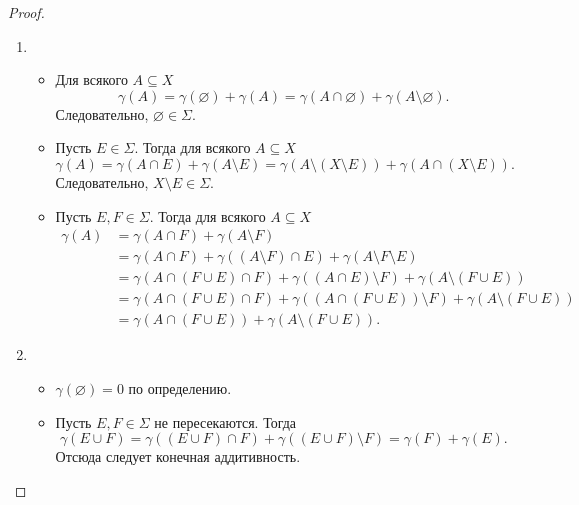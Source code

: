 \documentclass[12pt,a4paper]{article}
\begin{document}
    \begin{proof}
        \begin{enumerate}
            \item
                \begin{itemize}
                    \item Для всякого $A \subseteq X$
                        \[\gamma(A) = \gamma(\varnothing) + \gamma(A) = \gamma(A \cap \varnothing) + \gamma(A \setminus \varnothing).\]
                        Следовательно, $\varnothing \in \Sigma$.
                    \item Пусть $E \in \Sigma$. Тогда для всякого $A \subseteq X$
                        \[\gamma(A) = \gamma(A \cap E) + \gamma(A \setminus E) = \gamma(A \setminus (X \setminus E)) + \gamma(A \cap (X \setminus E)).\]
                        Следовательно, $X \setminus E \in \Sigma$.
                    \item Пусть $E, F \in \Sigma$. Тогда для всякого $A \subseteq X$
                        \begin{align*}
                            \gamma(A)
                            &= \gamma(A \cap F) + \gamma(A \setminus F)\\
                            &= \gamma(A \cap F) + \gamma((A \setminus F) \cap E) + \gamma(A \setminus F \setminus E)\\
                            &= \gamma(A \cap (F \cup E) \cap F) + \gamma((A \cap E) \setminus F) + \gamma(A \setminus (F \cup E))\\
                            &= \gamma(A \cap (F \cup E) \cap F) + \gamma((A \cap (F \cup E)) \setminus F) + \gamma(A \setminus (F \cup E))\\
                            &= \gamma(A \cap (F \cup E)) + \gamma(A \setminus (F \cup E)).
                        \end{align*}
                \end{itemize}
            \item 
                \begin{itemize}
                    \item $\gamma(\varnothing) = 0$ по определению.
                    \item Пусть $E, F \in \Sigma$ не пересекаются. Тогда
                        \[
                            \gamma(E \cup F)
                            = \gamma((E \cup F) \cap F) + \gamma((E \cup F) \setminus F)
                            = \gamma(F) + \gamma(E).
                        \]
                        Отсюда следует конечная аддитивность.

\end{itemize}
\end{enumerate}
\end{proof}
\end{document}
